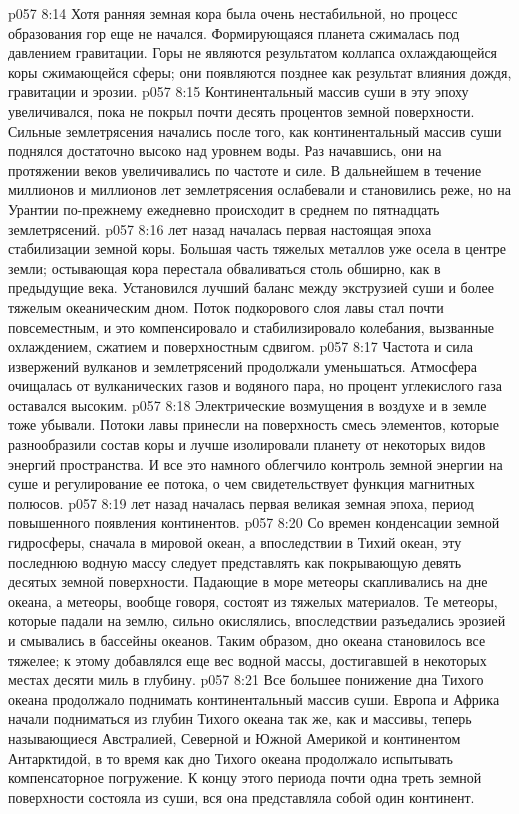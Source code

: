 \vs p057 8:14 Хотя ранняя земная кора была очень нестабильной, но процесс образования гор еще не начался. Формирующаяся планета сжималась под давлением гравитации. Горы не являются результатом коллапса охлаждающейся коры сжимающейся сферы; они появляются позднее как результат влияния дождя, гравитации и эрозии.
\vs p057 8:15 Континентальный массив суши в эту эпоху увеличивался, пока не покрыл почти десять процентов земной поверхности. Сильные землетрясения начались после того, как континентальный массив суши поднялся достаточно высоко над уровнем воды. Раз начавшись, они на протяжении веков увеличивались по частоте и силе. В дальнейшем в течение миллионов и миллионов лет землетрясения ослабевали и становились реже, но на Урантии по\hyp{}прежнему ежедневно происходит в среднем по пятнадцать землетрясений.
\vs p057 8:16 \pc {} лет назад началась первая настоящая эпоха стабилизации земной коры. Большая часть тяжелых металлов уже осела в центре земли; остывающая кора перестала обваливаться столь обширно, как в предыдущие века. Установился лучший баланс между экструзией суши и более тяжелым океаническим дном. Поток подкорового слоя лавы стал почти повсеместным, и это компенсировало и стабилизировало колебания, вызванные охлаждением, сжатием и поверхностным сдвигом.
\vs p057 8:17 Частота и сила извержений вулканов и землетрясений продолжали уменьшаться. Атмосфера очищалась от вулканических газов и водяного пара, но процент углекислого газа оставался высоким.
\vs p057 8:18 Электрические возмущения в воздухе и в земле тоже убывали. Потоки лавы принесли на поверхность смесь элементов, которые разнообразили состав коры и лучше изолировали планету от некоторых видов энергий пространства. И все это намного облегчило контроль земной энергии на суше и регулирование ее потока, о чем свидетельствует функция магнитных полюсов.
\vs p057 8:19 \pc {} лет назад началась первая великая земная эпоха, период повышенного появления континентов.
\vs p057 8:20 Со времен конденсации земной гидросферы, сначала в мировой океан, а впоследствии в Тихий океан, эту последнюю водную массу следует представлять как покрывающую девять десятых земной поверхности. Падающие в море метеоры скапливались на дне океана, а метеоры, вообще говоря, состоят из тяжелых материалов. Те метеоры, которые падали на землю, сильно окислялись, впоследствии разъедались эрозией и смывались в бассейны океанов. Таким образом, дно океана становилось все тяжелее; к этому добавлялся еще вес водной массы, достигавшей в некоторых местах десяти миль в глубину.
\vs p057 8:21 Все большее понижение дна Тихого океана продолжало поднимать континентальный массив суши. Европа и Африка начали подниматься из глубин Тихого океана так же, как и массивы, теперь называющиеся Австралией, Северной и Южной Америкой и континентом Антарктидой, в то время как дно Тихого океана продолжало испытывать компенсаторное погружение. К концу этого периода почти одна треть земной поверхности состояла из суши, вся она представляла собой один континент.
